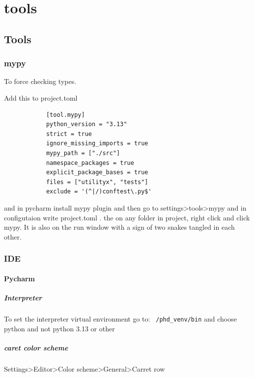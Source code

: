 \chapter{tools}
\section{Tools}
    
    \subsection{mypy}
        To force checking types.
        
        Add this to project.toml
        \begin{verbatim}
            [tool.mypy]
            python_version = "3.13"
            strict = true
            ignore_missing_imports = true
            mypy_path = ["./src"]
            namespace_packages = true
            explicit_package_bases = true
            files = ["utilityx", "tests"]
            exclude = '(^|/)conftest\.py$'
        \end{verbatim}
        
        and in pycharm install mypy plugin and then go to settings>tools>mypy and in configutaion write project.toml . the on any folder in project, right click and click mypy. It is also on the run window with a sign of two snakes tangled in each other.
    
    \subsection{IDE}
        
        \subsubsection{Pycharm}
            
            \paragraph{Interpreter} To set the interpreter virtual environment go to: \texttt{~/phd\_venv/bin} and choose python and not python 3.13 or other
            
            \paragraph{caret color scheme}
                Settings>Editor>Color scheme>General>Carret row
